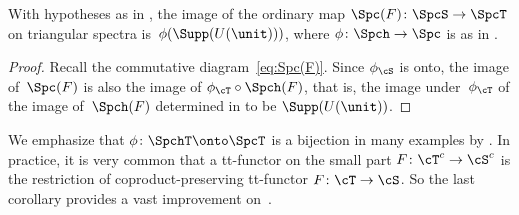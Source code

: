 \begin{Cor}
With hypotheses as in , the image of the ordinary map $\Spc(F)\colon\SpcS\to \SpcT$ on triangular spectra is~$\phi(\Supp(U(\unit)))$, where $\phi\colon \Spch\to\Spc$ is as in .
\end{Cor}

\begin{proof}
Recall the commutative diagram~\eqref{eq:Spc(F)}. Since $\phi_{\cS}$ is onto, the image of~$\Spc(F)$ is also the image of $\phi_{\cT}\circ\Spch(F)$, that is, the image under~$\phi_\cT$ of the image of~$\Spch(F)$ determined in  to be $\Supp(U(\unit))$.
\end{proof}

\begin{Rem}
We emphasize that $\phi\colon \SpchT\onto \SpcT$ is a bijection in many examples by \cite[\S5]{Balmer20a}. In practice, it is very common that a tt-functor on the small part $F\colon \cT^c\to \cS^c$ is the restriction of coproduct-preserving tt-functor $F\colon \cT\to \cS$. So the last corollary provides a vast improvement on~\cite{Balmer18a}.
\end{Rem}

